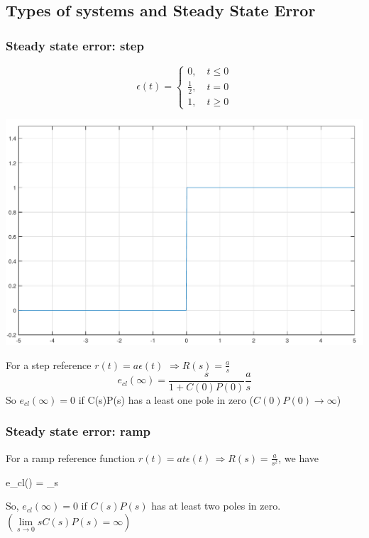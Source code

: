 \subsection[Types of systems and SS-error]{Types of systems and Steady State Error}

\begin{frame}
	\frametitle{Steady state error: step}
	\begin{definition}
		\begin{minipage}{0.4\linewidth}
			\[
			\epsilon (t) =
			\begin{cases}
			0, \quad t \leqslant 0 \\
			\frac{1}{2}, \quad t = 0 \\
			1, \quad t \geqslant 0
			\end{cases}
			\]
		\end{minipage}
		\begin{minipage}{0.5\linewidth}
			\hspace*{4em}
			\includegraphics[width=0.6\linewidth]{stepfunc}
		\end{minipage}
	\end{definition}
	\begin{block}{}
		For a step reference $r(t) = a \epsilon (t)$ $\Rightarrow R(s) = \frac{a}{s}$
		\[e_{cl}(\infty) = \frac{s}{1+C(0)P(0)} \frac{a}{s}\]
		So $e_{cl}(\infty) = 0$ if C(s)P(s) has a least one pole in zero ($C(0)P(0) \rightarrow \infty$)
	\end{block}
\end{frame}

\begin{frame}
	\frametitle{Steady state error: ramp}
	\begin{block}{}
		For a ramp reference function $r(t) = at \epsilon (t) \, \Rightarrow R(s) = \frac{a}{s^2}$, we have
		\begin{flalign*}
			e_{cl}(\infty) = \lim\limits_{s }  
		\end{flalign*}
		So, $e_{cl}(\infty) = 0$ if $C(s)P(s)$ has at least two poles in zero. $\left(\lim\limits_{s\rightarrow 0} sC(s)P(s) = \infty\right)$
	\end{block}
\end{frame}

